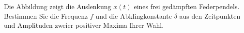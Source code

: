 \begin{ExerciseBlock}
Die Abbildung zeigt die Auslenkung $x(t)$ eines frei gedämpften Federpendels. Bestimmen Sie die Frequenz $f$ und die Abklingkonstante $\delta$ aus den Zeitpunkten und Amplituden zweier positiver Maxima Ihrer Wahl.
\begin{center}
\end{center}
\end{ExerciseBlock}
